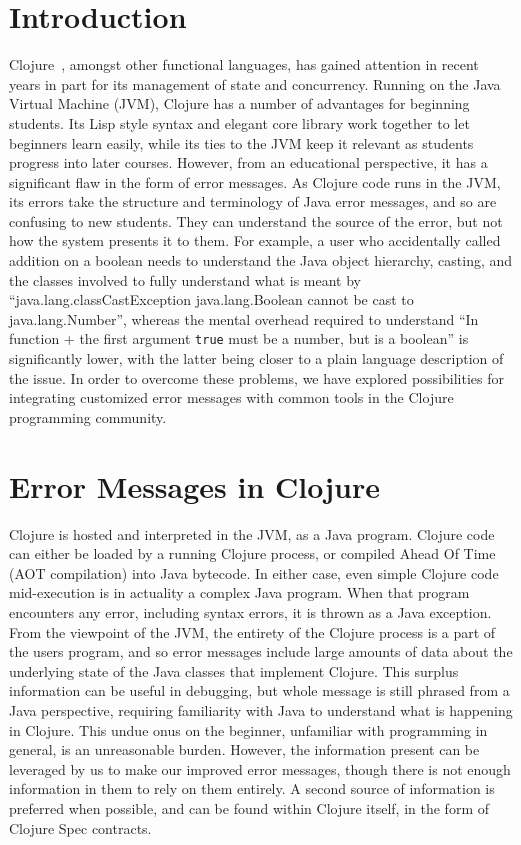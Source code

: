 \documentclass[12pt]{article}
\newcommand{\comment}[1]{{\bf \tt  {#1}}}
\newcommand{\emcomment}[1]{\textcolor{ForestGreen}{\comment{Elena: {#1}}}}
\begin{document}
\newpage
\setcounter{page}{1}

\section{Introduction}
Clojure~\cite{Hickey:2008}, amongst other functional languages, has gained attention in recent years
in part for its management of state and concurrency. 
Running on the Java Virtual Machine (JVM), Clojure has a number of advantages for beginning students.
Its Lisp style syntax and elegant core library work together to let beginners learn easily, while
its ties to the JVM keep it relevant as students progress into later courses.
However, from an educational perspective, it has a significant flaw in the form of error messages.
As Clojure code runs in the JVM, its errors take the structure and terminology of Java error messages,
and so are confusing to new students. They can understand the source of the error,
but not how the system presents it to them.
For example, a user who accidentally called addition on a boolean needs
 to understand the Java object hierarchy, casting,
 and the classes involved to fully understand what is meant by
 ``java.lang.classCastException java.lang.Boolean cannot be cast to java.lang.Number'',
whereas the mental overhead required to understand
``In function + the first argument {\tt true} must be a number, but is a boolean''
 is significantly lower, with the latter being closer to a plain language
 description of the issue.
 In order to overcome these problems,
 we have explored possibilities for integrating customized error messages
 with common tools in the Clojure programming community.

\section{Error Messages in Clojure}
Clojure is hosted and interpreted in the JVM, as a Java program.
Clojure code can either be loaded by a running Clojure process, or
compiled Ahead Of Time (AOT compilation) into Java bytecode. In either case,
even simple Clojure code mid-execution is in actuality a complex Java program.
When that program encounters any error, including syntax errors, it is thrown as a Java exception.
From the viewpoint of the JVM, the entirety of the Clojure process is
a part of the users program, and so error messages include large amounts
of data about the underlying state of the Java classes that implement Clojure.
This surplus information can be useful in debugging,
but whole message is still phrased from a Java perspective, requiring familiarity with Java
to understand what is happening in Clojure.
This undue onus on the beginner,
unfamiliar with programming in general, is an unreasonable burden.
However, the information present can be leveraged by us to make our improved
error messages, though there is not enough information in them to rely on them entirely.
A second source of information is preferred when possible, and can be found within Clojure itself,
in the form of Clojure Spec contracts.
\end{document}
